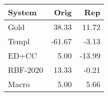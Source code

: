 \begin{tabular}{lrr}
\toprule
System & Orig & Rep \\
\midrule
Gold & 38.33 & 11.72 \\
Templ & -61.67 & -3.13 \\
ED+CC & 5.00 & -13.99 \\
RBF-2020 & 13.33 & -0.21 \\
Macro & 5.00 & 5.66 \\
\bottomrule
\end{tabular}
